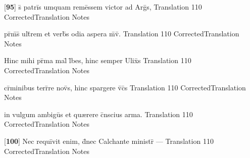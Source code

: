 \latline
  {[\textbf{95}] s\={\macron {\i}} patri\={}s umquam reme\={}ssem victor ad Arg\={}s,}
  { Translation }
  {110}
  { CorrectedTranslation }
  { Notes }


\latline
  {pr\={}m\={\macron {\i}}s\={\macron {\i}} ult\={}rem et verb\={\macron {\i}}s odia aspera m\={}v\={\macron {\i}}.}
  { Translation }
  {110}
  { CorrectedTranslation }
  { Notes }


\latline
  {Hinc mihi pr\={\macron {\i}}ma mal\={\macron {\i}} l\={}bes, hinc semper Ulix\={}s}
  { Translation }
  {110}
  { CorrectedTranslation }
  { Notes }


\latline
  {cr\={\macron {\i}}minibus terr\={}re nov\={\macron {\i}}s, hinc spargere v\={}c\={}s}
  { Translation }
  {110}
  { CorrectedTranslation }
  { Notes }


\latline
  {in vulgum ambigu\={}s et qu{\ae}rere c\={}nscius arma.}
  { Translation }
  {110}
  { CorrectedTranslation }
  { Notes }


\latline
  {[\textbf{100}] Nec requi\={}vit enim, d\={}nec Calchante ministr\={} ---}
  { Translation }
  {110}
  { CorrectedTranslation }
  { Notes }


